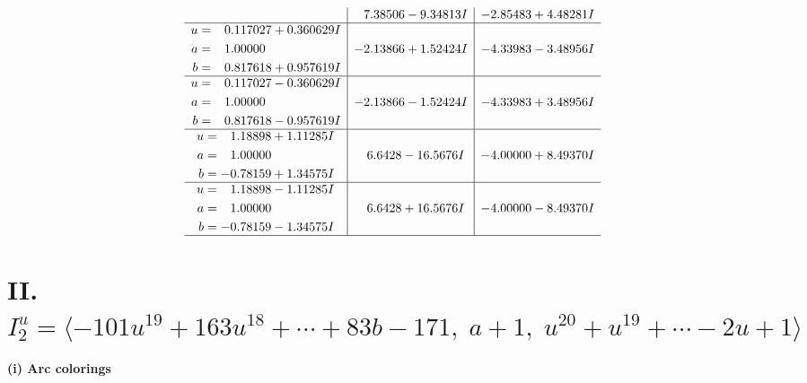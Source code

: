 \documentclass[1p]{elsarticle_modified}
\theoremstyle{definition}
\begin{document}
$$\begin{array}{c|c|c}
 & \phantom{-}7.38506 - 9.34813 I & -2.85483 + 4.48281 I \\ \hline\begin{aligned}
u &= \phantom{-}0.117027 + 0.360629 I \\
a &= \phantom{-}1.00000\phantom{ +0.000000I} \\
b &= \phantom{-}0.817618 + 0.957619 I\end{aligned}
 & -2.13866 + 1.52424 I & -4.33983 - 3.48956 I \\ \hline\begin{aligned}
u &= \phantom{-}0.117027 - 0.360629 I \\
a &= \phantom{-}1.00000\phantom{ +0.000000I} \\
b &= \phantom{-}0.817618 - 0.957619 I\end{aligned}
 & -2.13866 - 1.52424 I & -4.33983 + 3.48956 I \\ \hline\begin{aligned}
u &= \phantom{-}1.18898 + 1.11285 I \\
a &= \phantom{-}1.00000\phantom{ +0.000000I} \\
b &= -0.78159 + 1.34575 I\end{aligned}
 & \phantom{-}6.6428 - 16.5676 I & -4.00000 + 8.49370 I \\ \hline\begin{aligned}
u &= \phantom{-}1.18898 - 1.11285 I \\
a &= \phantom{-}1.00000\phantom{ +0.000000I} \\
b &= -0.78159 - 1.34575 I\end{aligned}
 & \phantom{-}6.6428 + 16.5676 I & -4.00000 - 8.49370 I\\
 \hline 
 \end{array}$$\newpage\newpage\renewcommand{\arraystretch}{1}
\centering \section*{II. $I^u_{2}= \langle -101 u^{19}+163 u^{18}+\cdots+83 b-171,\;a+1,\;u^{20}+u^{19}+\cdots-2 u+1 \rangle$}
\flushleft \textbf{(i) Arc colorings}\\
\end{document}
